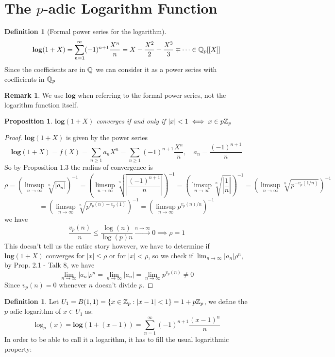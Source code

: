 \documentclass[a4paper]{article}
\theoremstyle{plain}
\newtheorem{prop}[thm]{Proposition}
\theoremstyle{definition}
\newtheorem{defi}[thm]{Definition}
\newtheorem{rem}[thm]{Remark}
\begin{document}
\section{The $p$-adic Logarithm Function}
\begin{defi}[Formal power series for the logarithm]
  $$\mathbf{log}(1+X) = \sum_{n=1}^{\infty} (-1)^{n+1}\frac {X^{n}}{n} = X - \frac{X^{2}}{2} + \frac{X^{3}}{3} \mp \cdots \in \Bbb Q_{p}[[X]]$$
  Since the coefficients are in $\Bbb Q$ we can consider it as a power series with coefficients in $\Bbb Q_{p}$
\end{defi}
\begin{rem}
We use $\mathbf{log}$ when referring to the formal power series, not the logarithm function itself.
\end{rem}
\begin{prop} $\mathbf{log}(1+X)$ converges if and only if $|x| < 1 \iff x \in p\Bbb Z_{p}$
\end{prop}
\begin{proof}
  $\mathbf{log}(1+X)$ is given by the power series
  $$\mathbf{log}(1+X) = f(X) = \sum_{n \geq 1}a_{n}X^{n} = \sum_{n\geq1} (-1)^{n+1}\frac {X^{n}}{n}, \quad a_{n} = \frac {(-1)^{n+1}}n $$
  So by Proposition 1.3 the radius of convergence is
  $$\rho = \left(\limsup_{n \to \infty} \sqrt[n]{|a_{n}|}\right)^{-1} = \left(\limsup_{n \to \infty} \sqrt[n]{\left|\frac {(-1)^{n+1}}n\right|}\right)^{-1} = \left(\limsup_{n \to \infty} \sqrt[n]{\left| \frac 1n\right|}\right)^{-1} = \left(\limsup_{n \to \infty} \sqrt[n]{p^{-v_{p}(1/n)}}\right)^{-1}$$
  $$ = \left(\limsup_{n \to \infty} \sqrt[n]{p^{v_{p}(n) - v_{p}(1)}}\right)^{-1} = \left( \limsup_{n \to \infty} p^{v_{p}(n) / n} \right)^{-1}$$
  we have
  $$\frac{v_{p}(n)}{n} \leq \frac{\log(n)}{\log(p)n} \xrightarrow{n \to \infty} 0 \implies \rho = 1$$
  This doesn't tell us the entire story however, we have to determine if $\mathbf{log}(1+X)$ converges for $|x| \leq \rho$ or for $|x| < \rho$, so we check if $\lim_{n \to \infty}|a_{n}|\rho^{n}$, by Prop. 2.1 - Talk 8, we have
  $$\lim_{n \to \infty}|a_{n}|\rho^{n} = \lim_{n \to \infty}|a_{n}| = \lim_{n \to \infty}p^{v_{p}(n)} \neq 0$$
  Since $v_{p}(n) = 0$ whenever $n$ doesn't divide $p$.
\end{proof}
\begin{defi}Let $U_{1} = B(1,1) = \{x \in \Bbb Z_{p} : |x-1| < 1\} = 1+p\Bbb Z_{p}$, we define the $p$-adic logarithm of $x \in U_{1}$ as:
  $$\log_{p}(x) = \mathbf{log}(1+(x-1)) = \sum_{n=1}^{\infty} (-1)^{n+1}\frac {(x-1)^{n}}{n}$$
  In order to be able to call it a logarithm, it has to fill the usual logarithmic property:
\end{defi}
\end{document}
